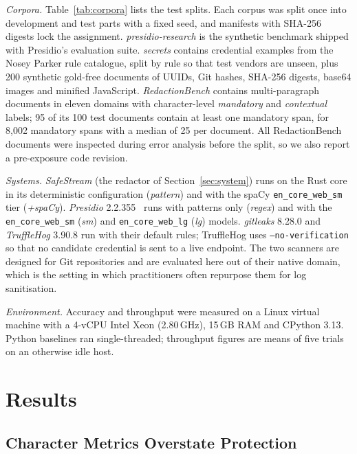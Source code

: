 \documentclass[conference]{IEEEtran}
\begin{document}
\textit{Corpora.} Table~\ref{tab:corpora} lists the test splits. Each corpus
was split once into development and test parts with a fixed seed, and
manifests with SHA-256 digests lock the assignment. \emph{presidio-research}
is the synthetic benchmark shipped with Presidio's evaluation suite.
\emph{secrets} contains credential examples from the Nosey Parker rule
catalogue, split by rule so that test vendors are unseen, plus 200 synthetic
gold-free documents of UUIDs, Git hashes, SHA-256 digests, base64 images and
minified JavaScript. \emph{RedactionBench} contains multi-paragraph documents
in eleven domains with character-level \emph{mandatory} and \emph{contextual}
labels; 95 of its 100 test documents contain at least one mandatory span, for
8{,}002 mandatory spans with a median of 25 per document. All RedactionBench
documents were inspected during error analysis before the split, so we also
report a pre-exposure code revision.

\textit{Systems.} \emph{SafeStream} (the redactor of
Section~\ref{sec:system}) runs on the Rust core in its deterministic
configuration (\emph{pattern}) and with the spaCy \texttt{en\_core\_web\_sm}
tier (\emph{+spaCy}). \emph{Presidio} 2.2.355~\cite{presidio} runs with
patterns only (\emph{regex}) and with the \texttt{en\_core\_web\_sm}
(\emph{sm}) and \texttt{en\_core\_web\_lg} (\emph{lg}) models.
\emph{gitleaks} 8.28.0 and \emph{TruffleHog} 3.90.8 run with their default
rules; TruffleHog uses \texttt{--no-verification} so that no candidate
credential is sent to a live endpoint. The two scanners are designed for Git
repositories and are evaluated here out of their native domain, which is the
setting in which practitioners often repurpose them for log sanitisation.

\textit{Environment.} Accuracy and throughput were measured on a Linux virtual
machine with a 4-vCPU Intel Xeon (2.80\,GHz), 15\,GB RAM and CPython 3.13.
Python baselines ran single-threaded; throughput figures are means of five
trials on an otherwise idle host.

\section{Results}
\label{sec:results}

\subsection{Character Metrics Overstate Protection}
\end{document}
